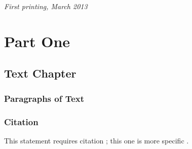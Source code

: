 \documentclass[11pt,fleqn]{book} %
\begin{document}
\noindent \textit{First printing, March 2013} %



\pagestyle{empty} %

\tableofcontents %

\cleardoublepage %

\pagestyle{fancy} %


\part{Part One}



\chapter{Text Chapter}

\section{Paragraphs of Text}

\lipsum[1-7] %


\section{Citation}

This statement requires citation \cite{book_key}; this one is more specific \cite[122]{article_key}.
\end{document}
